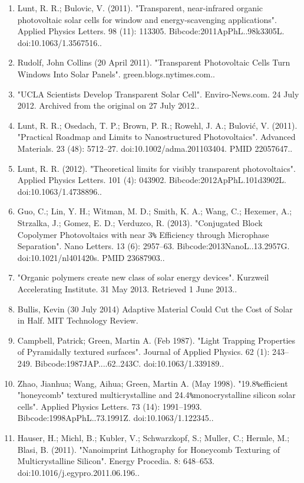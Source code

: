 \begin{enumerate}
\item Lunt, R. R.; Bulovic, V. (2011). "Transparent, near-infrared organic photovoltaic solar cells for window and energy-scavenging applications". Applied Physics Letters. 98 (11): 113305. Bibcode:2011ApPhL..98k3305L. doi:10.1063/1.3567516..
\item Rudolf, John Collins (20 April 2011). "Transparent Photovoltaic Cells Turn Windows Into Solar Panels". green.blogs.nytimes.com..
\item "UCLA Scientists Develop Transparent Solar Cell". Enviro-News.com. 24 July 2012. Archived from the original on 27 July 2012..
\item Lunt, R. R.; Osedach, T. P.; Brown, P. R.; Rowehl, J. A.; Bulović, V. (2011). "Practical Roadmap and Limits to Nanostructured Photovoltaics". Advanced Materials. 23 (48): 5712–27. doi:10.1002/adma.201103404. PMID 22057647..
\item Lunt, R. R. (2012). "Theoretical limits for visibly transparent photovoltaics". Applied Physics Letters. 101 (4): 043902. Bibcode:2012ApPhL.101d3902L. doi:10.1063/1.4738896..
\item Guo, C.; Lin, Y. H.; Witman, M. D.; Smith, K. A.; Wang, C.; Hexemer, A.; Strzalka, J.; Gomez, E. D.; Verduzco, R. (2013). "Conjugated Block Copolymer Photovoltaics with near 3\verb|%| Efficiency through Microphase Separation". Nano Letters. 13 (6): 2957–63. Bibcode:2013NanoL..13.2957G. doi:10.1021/nl401420s. PMID 23687903..
\item "Organic polymers create new class of solar energy devices". Kurzweil Accelerating Institute. 31 May 2013. Retrieved 1 June 2013..
\item Bullis, Kevin (30 July 2014) Adaptive Material Could Cut the Cost of Solar in Half. MIT Technology Review.
\item Campbell, Patrick; Green, Martin A. (Feb 1987). "Light Trapping Properties of Pyramidally textured surfaces". Journal of Applied Physics. 62 (1): 243–249. Bibcode:1987JAP....62..243C. doi:10.1063/1.339189..
\item Zhao, Jianhua; Wang, Aihua; Green, Martin A. (May 1998). "19.8\verb|%|efficient "honeycomb" textured multicrystalline and 24.4\verb|%|monocrystalline silicon solar cells". Applied Physics Letters. 73 (14): 1991–1993. Bibcode:1998ApPhL..73.1991Z. doi:10.1063/1.122345..
\item Hauser, H.; Michl, B.; Kubler, V.; Schwarzkopf, S.; Muller, C.; Hermle, M.; Blasi, B. (2011). "Nanoimprint Lithography for Honeycomb Texturing of Multicrystalline Silicon". Energy Procedia. 8: 648–653. doi:10.1016/j.egypro.2011.06.196..

\end{enumerate}
